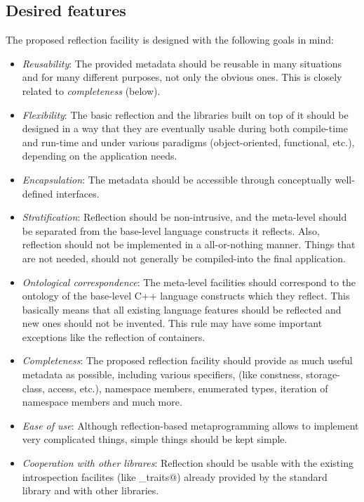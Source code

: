 \subsection{Desired features} 

The proposed reflection facility is designed with the following
goals in mind:

\begin{itemize}
\item {\em Reusability}: The provided metadata should be reusable
in many situations and for many different purposes, not only
the obvious ones. This is closely related to {\em completeness} (below).

\item {\em Flexibility}: The basic reflection and the libraries
built on top of it should be designed
in a way that they are eventually usable during both compile-time
and run-time and under various paradigms (object-oriented, functional, etc.),
depending on the application needs.

\item {\em  Encapsulation}: The metadata should be accessible
through conceptually well-defined interfaces.

\item {\em  Stratification}: Reflection should be non-intrusive,
and the meta-level should be separated from the base-level language
constructs it reflects. Also, reflection should not be implemented
in a all-or-nothing manner. Things that are not needed, should not generally
be compiled-into the final application.

\item {\em  Ontological correspondence}: The meta-level facilities should
correspond to the ontology of the base-level C++ language constructs
which they reflect. This basically means that all existing language
features should be reflected and new ones should not be invented.
This rule may have some important exceptions like the reflection of
containers.

\item {\em  Completeness}: The proposed reflection facility should
provide as much useful metadata as possible, including various specifiers,
(like constness, storage-class, access, etc.), namespace members,
enumerated types, iteration of namespace members and much more.

\item {\em  Ease of use}: Although reflection-based metaprogramming
allows to implement very complicated things, simple things
should be kept simple.

\item {\em  Cooperation with other librares}: Reflection should be
usable with the existing introspection facilites (like \verb@type_traits@)
already provided by the standard library and with other libraries.
\end{itemize}
